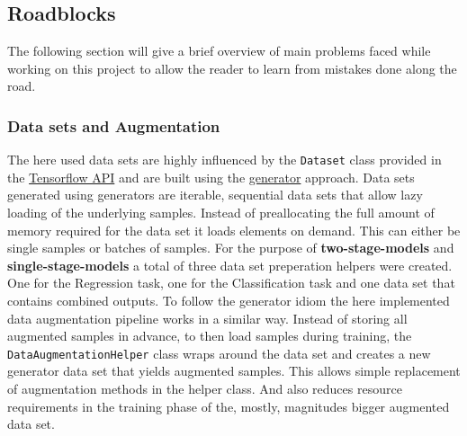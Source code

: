 \subsection{Roadblocks}\label{subsec:roadblocks}
The following section will give a brief overview of main problems faced while working on this project to allow the reader to learn from mistakes done along the road.
\subsubsection{Data sets and Augmentation}
The here used data sets are highly influenced by the \lstinline{Dataset} class provided in the \href{https://www.tensorflow.org/api_docs/python/tf/data/Dataset}{Tensorflow API} and are built using the \href{https://www.tensorflow.org/api_docs/python/tf/data/Dataset#from_generator}{generator} approach.
Data sets generated using generators are iterable, sequential data sets that allow lazy loading of the underlying samples.
Instead of preallocating the full amount of memory required for the data set it loads elements on demand.
This can either be single samples or batches of samples.
For the purpose of \textbf{two-stage-models} and \textbf{single-stage-models} a total of three data set preperation helpers were created.
One for the Regression task, one for the Classification task and one data set that contains combined outputs.
To follow the generator idiom the here implemented data augmentation pipeline works in a similar way.
Instead of storing all augmented samples in advance, to then load samples during training, the \lstinline[language=Python]{DataAugmentationHelper} class wraps around the data set and creates a new generator data set that yields augmented samples.
This allows simple replacement of augmentation methods in the helper class.
And also reduces resource requirements in the training phase of the, mostly, magnitudes bigger augmented data set.
